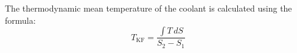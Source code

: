 The thermodynamic mean temperature of the coolant is calculated using the formula:  
\[
T_{\text{KF}} = \frac{\int T \, dS}{S_2 - S_1}
\]